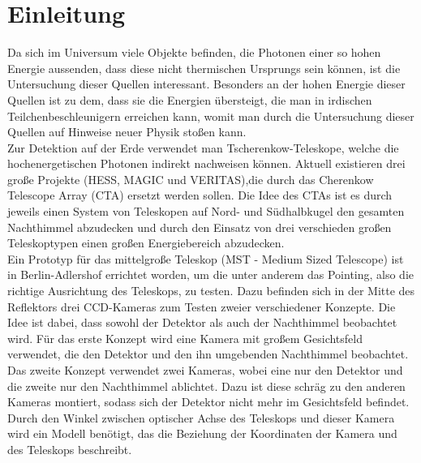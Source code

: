 \chapter{Einleitung}
Da sich im Universum viele Objekte befinden, die Photonen einer so hohen Energie aussenden, dass diese nicht thermischen Ursprungs sein können, ist die Untersuchung dieser Quellen interessant. Besonders an der hohen Energie dieser Quellen ist zu dem, dass sie die Energien übersteigt, die man in irdischen Teilchenbeschleunigern erreichen kann, womit man durch die Untersuchung dieser Quellen auf Hinweise neuer Physik stoßen kann.\\
Zur Detektion auf der Erde verwendet man Tscherenkow-Teleskope, welche die hochenergetischen Photonen indirekt nachweisen können. Aktuell existieren drei große Projekte (HESS, MAGIC und VERITAS),die durch das Cherenkow Telescope Array (CTA) ersetzt werden sollen. Die Idee des CTAs ist es durch jeweils einen System von Teleskopen auf Nord- und Südhalbkugel den gesamten Nachthimmel abzudecken und durch den Einsatz von drei verschieden großen Teleskoptypen einen großen Energiebereich abzudecken.\\
Ein Prototyp für das mittelgroße Teleskop (MST - Medium Sized Telescope) ist in Berlin-Adlershof errichtet worden, um die unter anderem das Pointing, also die richtige Ausrichtung des Teleskops, zu testen. Dazu befinden sich in der Mitte des Reflektors drei CCD-Kameras zum Testen zweier verschiedener Konzepte. Die Idee ist dabei, dass sowohl der Detektor als auch der Nachthimmel beobachtet wird. Für das erste Konzept wird eine Kamera mit großem Gesichtsfeld verwendet, die den Detektor und den ihn umgebenden Nachthimmel beobachtet. Das zweite Konzept verwendet zwei Kameras, wobei eine nur den Detektor und die zweite nur den Nachthimmel ablichtet. Dazu ist diese schräg zu den anderen Kameras montiert, sodass sich der Detektor nicht mehr im Gesichtsfeld befindet. Durch den Winkel zwischen optischer Achse des Teleskops und dieser Kamera wird ein Modell benötigt, das die Beziehung der Koordinaten der Kamera und des Teleskops beschreibt.
